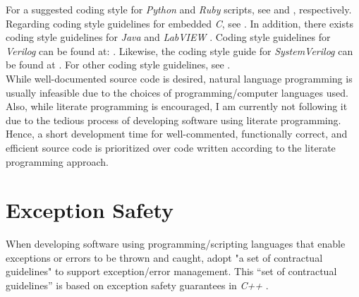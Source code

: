 \documentclass[letter,12pt]{article}
\begin{document}
For a suggested coding style for {\it Python} and {\it Ruby} scripts, see \cite{vanRossum2013} and \cite{Macdonald20XY}, respectively. Regarding coding style guidelines for embedded {\it C}, see \cite{Barr2013,Labrosse1999}. In addition, there exists coding style guidelines for {\it Java} \cite{OracleCorporationStaff20XYa,Smith2003,OracleCorporationStaff2016b,OracleCorporationStaff2016,OracleCorporationStaff20XY,Long1995,Carrano2012} and {\it LabVIEW} \cite{Blume2007a,Conway2003}. Coding style guidelines for {\it Verilog} can be found at: \cite{Bening2001,Bening2000}. Likewise, the coding style guide for {\it SystemVerilog} can be found at \cite{Mintz2007}. For other coding style guidelines, see \cite{Wolf20XY,Cady2017,IntelCorporationStaff2015,Schneider2013a,Weatherwax2008,Laplante2012,McConnell2004,Feathers2005,Koopman2010,Valvano2007,Fingeroff2010,Shore2008,Schach2007,Kernighan1982}. \\




While well-documented source code is desired, natural language programming \cite{WikipediaContributors2016i} is usually infeasible due to the choices of programming/computer languages used. Also, while literate programming \cite{Knuth1984,Knuth1992a,McConnell2004,Subramaniam2006,Schach2007,Oram2007,MullerHannemann2010}
 is encouraged, I am currently not following it due to the tedious process of developing software using literate programming. Hence, a short development time for well-commented, functionally correct, and efficient source code is prioritized over code written according to the literate programming approach.


\section{Exception Safety}
\label{sec:ExceptionSafety}

When developing software using programming/scripting languages that enable exceptions or errors to be thrown and caught, adopt "a set of contractual guidelines" \cite{WikipediaContributors2016f} to support exception/error management. This ``set of contractual guidelines'' is based on exception safety guarantees in {\it C++} \cite{Abrahams1998,Abrahams2001,WikipediaContributors2016f} \cite[Subsection \S4.4 on ``Writing exception safe code'']{WikibooksContributors2016}. \\
\end{document}

